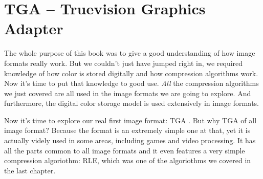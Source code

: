 \begin{comment}
  
\end{comment}

\chapter{TGA -- Truevision Graphics Adapter}
\label{cha:tga}

\begin{refsection}

  \cite{91:_truev_tga_file_format_specif}

  The whole purpose of this book was to give a good understanding of
  how image formats really work. But we couldn't just have jumped
  right in, we required knowledge of how color is stored digitally and
  how compression algorithms work. Now it's time to put that knowledge
  to good use. \textit{All} the compression algorithms we just covered
  are all used in the image formats we are going to explore. And
  furthermore, the digital color storage model is used extensively in
  image formats.

  Now it's time to explore our real first image format: TGA . But why TGA of
  all image format? Because the format is an extremely simple one at
  that, yet it is actually videly used in some areas, including games
  and video processing. It has all the parts common to all image
  formats and it even features a very simple compression algoriothm:
  RLE, which was one of the algoriothms we covered in the last
  chapter.

  \printbibliography[heading=subbibliography]

\end{refsection}
